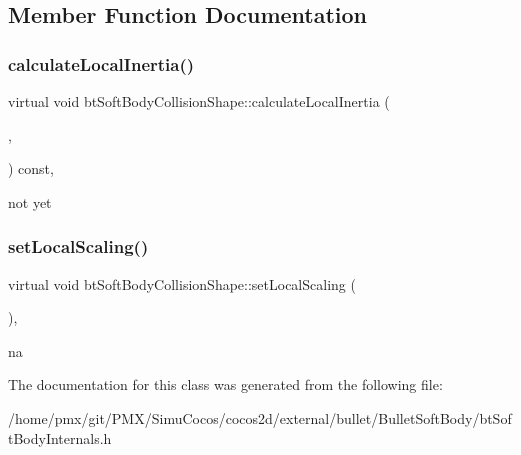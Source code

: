 \subsection{Member Function Documentation}
\mbox{\label{classbtSoftBodyCollisionShape_a03573ba1bcb8f6599493f80a7f0aae1e}} 
\subsubsection{\texorpdfstring{calculate\+Local\+Inertia()}{calculateLocalInertia()}}
{\footnotesize\ttfamily virtual void bt\+Soft\+Body\+Collision\+Shape\+::calculate\+Local\+Inertia (\begin{DoxyParamCaption}\item[{bt\+Scalar}]{,  }\item[{bt\+Vector3 \&}]{ }\end{DoxyParamCaption}) const\hspace{0.3cm}{\ttfamily [inline]}, {\ttfamily [virtual]}}

not yet \mbox{\label{classbtSoftBodyCollisionShape_a4458e1135af76b7ddbaa4befe0bfbc7a}} 
\subsubsection{\texorpdfstring{set\+Local\+Scaling()}{setLocalScaling()}}
{\footnotesize\ttfamily virtual void bt\+Soft\+Body\+Collision\+Shape\+::set\+Local\+Scaling (\begin{DoxyParamCaption}\item[{const bt\+Vector3 \&}]{ }\end{DoxyParamCaption})\hspace{0.3cm}{\ttfamily [inline]}, {\ttfamily [virtual]}}

na 

The documentation for this class was generated from the following file\+:\begin{DoxyCompactItemize}
\item 
/home/pmx/git/\+P\+M\+X/\+Simu\+Cocos/cocos2d/external/bullet/\+Bullet\+Soft\+Body/bt\+Soft\+Body\+Internals.\+h\end{DoxyCompactItemize}

